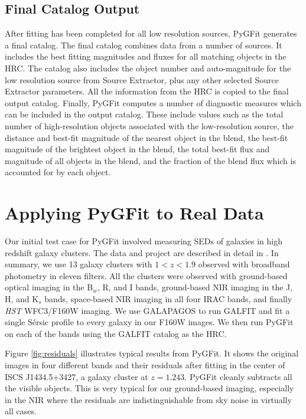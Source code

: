 \documentclass[preprint]{aastex}
\newcommand{\sersic}{S\'{e}rsic}
\newcommand{\galfit}{GALFIT}
\newcommand{\pygfit}{PyGFit}
\newcommand{\extractor}{Source Extractor}
\newcommand{\galapagos}{GALAPAGOS}
\begin{document}
\subsection{Final Catalog Output}\label{sec:catalog}

After fitting has been completed for all low resolution sources, \pygfit{} generates a final catalog.  The final catalog combines data from a number of sources.  It includes the best fitting magnitudes and fluxes for all matching objects in the HRC. The catalog also includes the object number and auto-magnitude for the low resolution source from \extractor{}, plus any other selected \extractor{} parameters.  All the information from the HRC is copied to the final output catalog.  Finally, \pygfit{} computes a number of diagnostic measures which can be included in the output catalog.  These include values such as the total number of high-resolution objects associated with the low-resolution source, the distance and best-fit magnitude of the nearest object in the blend, the best-fit magnitude of the brightest object in the blend, the total best-fit flux and magnitude of all objects in the blend, and the fraction of the blend flux which is accounted for by each object.

\section{Applying PyGFit to Real Data}\label{sec:example}

Our initial test case for \pygfit{} involved measuring SEDs of galaxies in high redshift galaxy clusters.  The data and project are described in detail in \citet{mancone13}.  In summary, we use 13 galaxy clusters with $1 < z < 1.9$ observed with broadband photometry in eleven filters.  All the clusters were observed with ground-based optical imaging in the B$_w$, R, and I bands, ground-based NIR imaging in the J, H, and K$_s$ bands, space-based NIR imaging in all four IRAC bands, and finally {\itshape HST} WFC3/F160W imaging.  We use \galapagos{} \citep{galapagos} to run \galfit{} and fit a single \sersic{} profile to every galaxy in our F160W images.  We then run \pygfit{} on each of the bands using the \galfit{} catalog as the HRC.

Figure \ref{fig:residuals} illustrates typical results from \pygfit{}.  It shows the original images in four different bands and their residuals after fitting in the center of ISCS J1434.5+3427, a galaxy cluster at $z=1.243$.  \pygfit{} cleanly subtracts all the visible objects.  This is very typical for our ground-based imaging, especially in the NIR where the residuals are indistinguishable from sky noise in virtually all cases.
\end{document}
